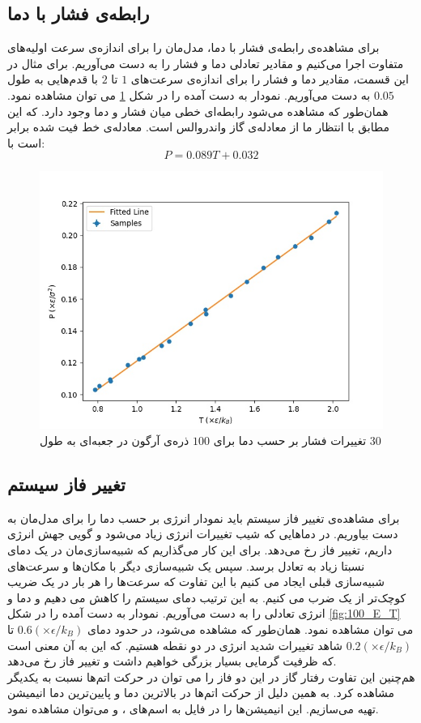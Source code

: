 \documentclass[11pt, a4paper]{article}
\begin{document}
\subsection{رابطه‌ی فشار با دما}
برای مشاهده‌ی رابطه‌ی فشار با دما،
مدل‌مان را برای اندازه‌ی سرعت اولیه‌‌های متفاوت اجرا می‌کنیم و مقادیر تعادلی دما و فشار را به دست می‌آوریم.
برای مثال در این قسمت، مقادیر دما و فشار را برای اندازه‌‌ی سرعت‌های
$1$
تا
$2$
با قدم‌هایی به طول
$0.05$
به دست می‌‌آوریم.
نمودار به دست آمده را در شکل
\ref{fig:100_P_T}
می توان مشاهده نمود.
همان‌طور که مشاهده می‌شود رابطه‌‌ای خطی میان فشار و دما وجود دارد.
که این مطابق با انتظار ما از معادله‌ی گاز واندروالس است.
معادله‌ی خط فیت شده برابر است با:
\begin{equation}
  P = 0.089T + 0.032
\end{equation}

\begin{figure}[h!]
	\centering
  \includegraphics[width=.7\textwidth]{MD_30_100_2_0.001_P_T.jpg}
  \caption{تغییرات فشار بر حسب دما برای $100$ ذره‌ی آرگون در جعبه‌ای به طول $30$}
  \label{fig:100_P_T}
\end{figure}


\subsection{تغییر فاز سیستم}
برای مشاهده‌ی تغییر فاز سیستم باید نمودار انرژی بر حسب دما را برای مدل‌مان به دست بیاوریم.
در دماهایی که شیب تغییرات انرژی زیاد می‌شود و گویی جهش انرژی داریم، تغییر فاز رخ می‌دهد.
برای این‌ کار می‌گذاریم که شبیه‌سازی‌مان در یک دمای نسبتا زیاد به تعادل برسد.
سپس یک شبیه‌سازی دیگر با مکان‌ها و سرعت‌های شبیه‌سازی قبلی ایجاد می کنیم
با این تفاوت که سرعت‌ها را هر بار در یک ضریب کوچک‌تر از یک ضرب می کنیم.
به این ترتیب دمای سیستم را کاهش می دهیم و دما و انرژی تعادلی را به دست می‌آوریم.
نمودار به دست آمده را در شکل
\ref{fig:100_E_T}
می توان مشاهده نمود.
همان‌طور که مشاهده می‌شود، در حدود دمای
$0.6 (\times \epsilon / k_B)$
تا
$0.2 (\times \epsilon / k_B)$
شاهد تغییرات شدید انرژی در دو نقطه هستیم.
که این به آن معنی است که ظرفیت گرمایی بسیار بزرگی خواهیم داشت و تغییر فاز رخ می‌دهد.
\\
هم‌چنین این تفاوت رفتار گاز در این دو فاز را می توان در حرکت اتم‌ها نسبت به یکدیگر مشاهده کرد.
به همین دلیل از حرکت اتم‌ها در بالاترین دما و پایین‌ترین دما انیمیشن تهیه می‌سازیم.
این انیمیشن‌ها را در فایل
به اسم‌های
،
و
می‌توان مشاهده نمود.
\end{document}
